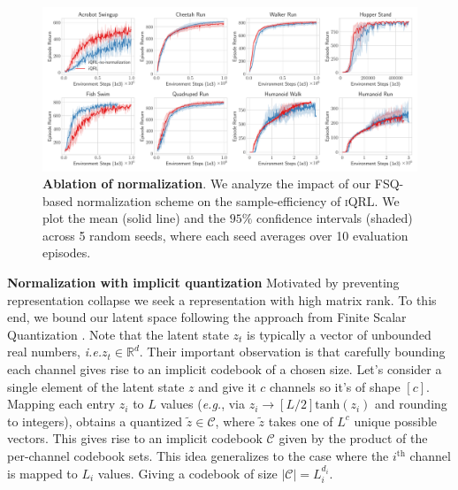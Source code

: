 \documentclass{article}
\makeatletter
\theoremstyle{plain}
\theoremstyle{definition}
\theoremstyle{remark}
\newcommand{\our}{\textsc{iQRL}\xspace}
\newcommand{\eg}{\textit{e.g.\@}\xspace}
\newcommand{\ie}{\textit{i.e.\@}\xspace}
\newcommand{\R}{\mathbb{R}}
\makeatother
\begin{document}
\begin{figure}[ht]
\vskip 0.2in
\begin{center}
\centerline{\includegraphics[width=1.0\textwidth]{./figs/normalization-ablation.pdf}}
\caption{\textbf{Ablation of normalization}. We analyze the impact of our FSQ-based normalization scheme on the sample-efficiency of \our. We plot the mean (solid line) and the $95\%$ confidence intervals (shaded) across 5 random seeds, where each seed averages over 10 evaluation episodes.}
\label{fig:normalization-ablation}
\end{center}
\vskip -0.2in
\end{figure}

\textbf{Normalization with implicit quantization}
Motivated by preventing representation collapse we seek a representation with high matrix rank.
To this end, we bound our latent space following the approach from
Finite Scalar Quantization \citep[FSQ,][]{mentzerFiniteScalarQuantization2023}.
Note that the latent state $z_{t}$ is typically a vector of unbounded real numbers, \ie $z_{t} \in \R^{d}$.
Their important observation is that carefully bounding each channel gives rise to an implicit codebook of a chosen size.
Let's consider a single element of the latent state $z$ and give it $c$ channels so it's of shape $[c]$.
Mapping each entry $z_{i}$ to $L$ values (\eg, via $z_{i} \rightarrow [L/2] \text{tanh}(z_{i})$ and rounding to integers),
obtains a quantized $\tilde{z} \in \mathcal{C}$, where $\tilde{z}$ takes one of $L^{c}$ unique possible vectors.
This gives rise to an implicit codebook $\mathcal{C}$ given by the product of the per-channel codebook sets.
This idea generalizes to the case where the $i^{\text{th}}$ channel is mapped to $L_{i}$ values.
Giving a codebook of size $|\mathcal{C}| = L_{i}^{d_{i}}$.
\end{document}
